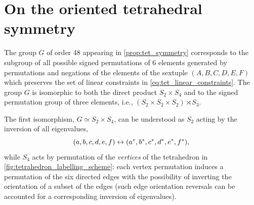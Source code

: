 \documentclass[notitlepage, 10pt]{article}
\begin{document}
\appendix

\section{On the oriented tetrahedral symmetry}

The group $G$ of order $48$ appearing in \cref{prop:tet_symmetry} corresponds to the subgroup of all possible signed permutations of $6$ elements generated by permutations and negations of the elements of the sextuple $(A,B,C,D,E,F)$ which preserves the set of linear constraints in \cref{eq:tet_linear_constraints}.
The group $G$ is isomorphic to both the direct product $S_2 \times S_4$ and to the signed permutation group of three elements, i.e., $(S_2 \times S_2 \times S_2) \rtimes S_3$.

The first isomorphism, $G \simeq S_2 \times S_4$, can be understood as $S_2$ acting by the inversion of all eigenvalues,
\begin{equation}
    (a,b,c,d,e,f) \leftrightarrow (a^*,b^*,c^*,d^*,e^*,f^*),
\end{equation}
while $S_4$ acts by permutation of the \textit{vertices} of the tetrahedron in \cref{fig:tetrahedron_labelling_scheme}:
each vertex permutation induces a permutation of the six directed edges with the possibility of inverting the orientation of a subset of the edges (such edge orientation reversals can be accounted for a corresponding inversion of eigenvalues).
\end{document}
